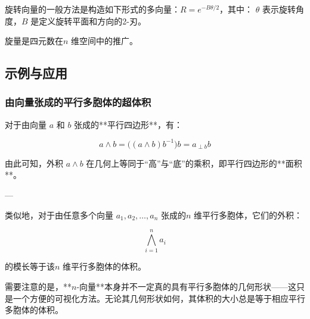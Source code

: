 旋转向量的一般方法是构造如下形式的多向量：$R = e^{-B\theta / 2}$，其中：
$\theta$ 表示旋转角度，$B$ 是定义旋转平面和方向的2-刃。

旋量是四元数在$n$ 维空间中的推广。
\subsection{示例与应用}
\subsubsection{由向量张成的平行多胞体的超体积}

对于由向量 $a$ 和 $b$ 张成的**平行四边形**，有：

$$
a \wedge b = \bigl((a \wedge b)b^{-1}\bigr)b = a_{\perp b} b
$$

由此可知，外积 $a \wedge b$ 在几何上等同于“高”与“底”的乘积，即平行四边形的**面积**。

---

类似地，对于由任意多个向量 $a_1, a_2, \ldots, a_n$ 张成的\*\*$n$ 维平行多胞体\*\*，它们的外积：

$$
\bigwedge_{i=1}^n a_i
$$

的模长等于该\*\*$n$ 维平行多胞体的体积\*\*。

需要注意的是，**$n$-向量**本身并不一定真的具有平行多胞体的几何形状——这只是一个方便的可视化方法。无论其几何形状如何，其体积的大小总是等于相应平行多胞体的体积。
